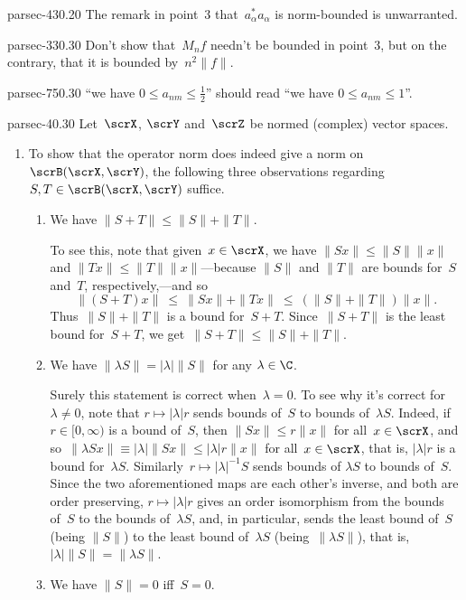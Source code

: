 \documentclass[b5page]{book}
\begin{document}
\begin{erratum}{parsec-430.20}
The remark in point~3 that~$a_\alpha^*a_\alpha$
is norm-bounded is unwarranted.
\end{erratum}
\begin{erratum}{parsec-330.30}
Don't show that~$M_nf$ needn't be bounded
in point~3,
but on the contrary, that it is bounded by~$n^2\|f\|$.
\end{erratum}
\begin{erratum}{parsec-750.30}
``we have $0\leq a_{nm}\leq \frac{1}{2}$''
should read ``we have $0\leq a_{nm}\leq 1$''.
\end{erratum}

\begin{solution}{parsec-40.30}%
Let~$\scrX$, $\scrY$ and~$\scrZ$ be normed (complex) vector spaces.
\begin{enumerate}
\item
To show that the operator norm does indeed
give a norm on~$\scrB(\scrX,\scrY)$,
the following
three observations
regarding $S,T\in\scrB(\scrX,\scrY)$
suffice.
\begin{enumerate}
\item
We have $\|S+T\|\leq \|S\|+\|T\|$.

To see this,
note that
given~$x\in \scrX$,
we have $\|Sx\|\leq \|S\|\|x\|$
and $\|Tx\|\leq \|T\|\|x\|$---because $\|S\|$ and $\|T\|$ are bounds
for~$S$ and~$T$, respectively,---and so 
\begin{equation*}
    \|(S+T)x\|
\ \leq\  \|Sx\|+\|Tx\|
\ \leq\  (\|S\|+\|T\|)\|x\|.
\end{equation*}
Thus~$\|S\|+\|T\|$ is a bound for~$S+T$.
Since~$\|S+T\|$ is the least bound for~$S+T$,
we get~$\|S+T\|\leq \|S\|+\|T\|$.

\item
We have
$\|\lambda S\|=\left|\lambda \right| \|S\|$
for any $\lambda \in \C$.

Surely this statement is correct when~$\lambda= 0$.
To see why it's correct for~$\lambda \neq 0$,
note that
$r\mapsto \left|\lambda\right| r$
sends bounds of~$S$ to bounds of~$\lambda S$.
Indeed,
if~$r\in[0,\infty)$ is a bound of~$S$,
then $\|Sx\|\leq r\|x\|$
for all~$x\in \scrX$,
and so~$\|\lambda Sx\| \equiv 
\left|\lambda \right|\|Sx\|\leq \left|\lambda\right| r \|x\|$
for all~$x\in\scrX$,
that is, $\left|\lambda\right|r$
is a bound for~$\lambda S$.
Similarly~$r\mapsto \left|\lambda\right|^{-1} S$
sends bounds of $\lambda S$
to bounds of~$S$.
Since the two aforementioned maps are each other's inverse,
and both are order preserving,
$r\mapsto \left|\lambda \right|r$
gives an order isomorphism from 
the bounds of~$S$ to the bounds of~$\lambda S$,
and, in particular,
    sends the least bound of~$S$ (being $\|S\|$)
to the least bound of~$\lambda S$
        (being~$\|\lambda S\|$),
that is,
$\left|\lambda\right|\|S\|=\|\lambda S\|$.
\item
We have $\|S\|=0$ iff~$S=0$.


\end{enumerate}
\end{enumerate}
\end{solution}
\end{document}
